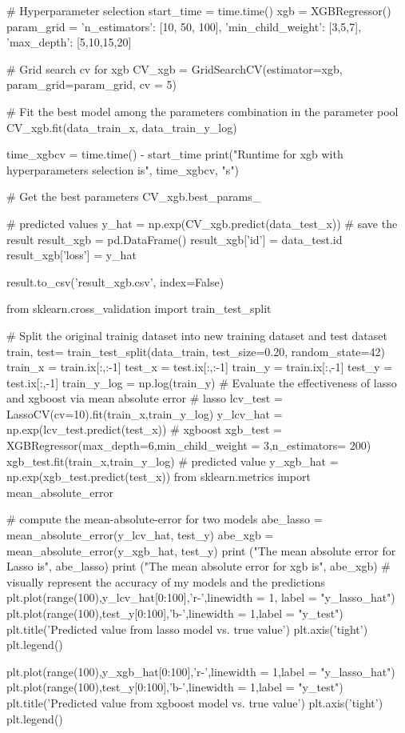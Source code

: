 \documentclass[12pt]{article}
\begin{document}
\begin{python}
# Hyperparameter selection
start_time = time.time()
xgb = XGBRegressor()
param_grid = { 
     'n_estimators': [10, 50, 100],
     'min_child_weight': [3,5,7],
     'max_depth': [5,10,15,20]
}

# Grid search cv for xgb
CV_xgb = GridSearchCV(estimator=xgb, param_grid=param_grid, cv = 5)

# Fit the best model among the parameters combination in the parameter pool 
CV_xgb.fit(data_train_x, data_train_y_log)

time_xgbcv = time.time() - start_time
print("Runtime for xgb with hyperparameters selection is", time_xgbcv, "s")

# Get the best parameters
CV_xgb.best_params_

# predicted values
y_hat = np.exp(CV_xgb.predict(data_test_x))
# save the result
result_xgb = pd.DataFrame()
result_xgb['id'] = data_test.id
result_xgb['loss'] = y_hat

result.to_csv('result_xgb.csv', index=False)


from sklearn.cross_validation import train_test_split


# Split the original trainig dataset into new training dataset and test dataset
train, test= train_test_split(data_train, test_size=0.20, random_state=42)
train_x = train.ix[:,:-1]
test_x = test.ix[:,:-1]
train_y = train.ix[:,-1]
test_y = test.ix[:,-1]
train_y_log = np.log(train_y)
# Evaluate the effectiveness of lasso and xgboost via mean absolute error
# lasso
lcv_test = LassoCV(cv=10).fit(train_x,train_y_log)
y_lcv_hat = np.exp(lcv_test.predict(test_x))
# xgboost
xgb_test = XGBRegressor(max_depth=6,min_child_weight = 3,n_estimators= 200)
xgb_test.fit(train_x,train_y_log)
# predicted value
y_xgb_hat = np.exp(xgb_test.predict(test_x))
from sklearn.metrics import mean_absolute_error

# compute the mean-absolute-error for two models
abe_lasso = mean_absolute_error(y_lcv_hat, test_y)
abe_xgb = mean_absolute_error(y_xgb_hat, test_y)
print ("The mean absolute error for Lasso is", abe_lasso)
print ("The mean absolute error for xgb is", abe_xgb)
# visually represent the accuracy of my models and the predictions 
plt.plot(range(100),y_lcv_hat[0:100],'r-',linewidth = 1, label = "y_lasso_hat")
plt.plot(range(100),test_y[0:100],'b-',linewidth = 1,label = "y_test")
plt.title('Predicted value from lasso model vs. true value')
plt.axis('tight')
plt.legend()

plt.plot(range(100),y_xgb_hat[0:100],'r-',linewidth = 1,label = "y_lasso_hat")
plt.plot(range(100),test_y[0:100],'b-',linewidth = 1,label = "y_test")
plt.title('Predicted value from xgboost model vs. true value')
plt.axis('tight')
plt.legend()


\end{python}
\end{document}
